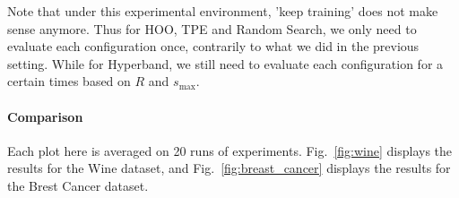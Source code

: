 \documentclass[twoside,11pt]{article}
\begin{document}
Note that under this experimental environment, 'keep training' does not make sense anymore. Thus for HOO, TPE and Random Search, we only need to evaluate each configuration once, contrarily to what we did in the previous setting. While for Hyperband, we still need to evaluate each configuration for a certain times based on $R$ and $s_{\max}$.

\paragraph{\textbf{Comparison}} Each plot here is averaged on 20 runs of experiments. Fig.~\ref{fig:wine} displays the results for the Wine dataset, and Fig.~\ref{fig:breast_cancer} displays the results for the Brest Cancer dataset.

\begin{figure}%
    \centering
    \qquad
    \qquad
    \qquad

\end{figure}
\end{document}
